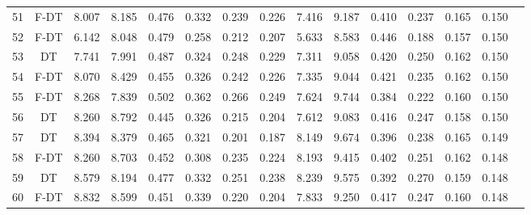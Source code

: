 \begin{longtable}{@{\hskip3pt}c@{\hskip3pt}c@{\hskip3pt}c@{\hskip3pt}c@{\hskip3pt}c@{\hskip3pt}c@{\hskip3pt}c@{\hskip3pt}c@{\hskip3pt}c@{\hskip3pt}c@{\hskip3pt}c@{\hskip3pt}c@{\hskip3pt}c@{\hskip3pt}c@{\hskip3pt}c}
         51 &           F-DT &             8.007 &       8.185 &         0.476 &       0.332 &       0.239 &        0.226 &               7.416 &       9.187 &         0.410 &       0.237 &       0.165 &        0.150 \\
         52 &           F-DT &             6.142 &       8.048 &         0.479 &       0.258 &       0.212 &        0.207 &               5.633 &       8.583 &         0.446 &       0.188 &       0.157 &        0.150 \\
         53 &             DT &             7.741 &       7.991 &         0.487 &       0.324 &       0.248 &        0.229 &               7.311 &       9.058 &         0.420 &       0.250 &       0.162 &        0.150 \\
         54 &           F-DT &             8.070 &       8.429 &         0.455 &       0.326 &       0.242 &        0.226 &               7.335 &       9.044 &         0.421 &       0.235 &       0.162 &        0.150 \\
         55 &           F-DT &             8.268 &       7.839 &         0.502 &       0.362 &       0.266 &        0.249 &               7.624 &       9.744 &         0.384 &       0.222 &       0.160 &        0.150 \\
         56 &             DT &             8.260 &       8.792 &         0.445 &       0.326 &       0.215 &        0.204 &               7.612 &       9.083 &         0.416 &       0.247 &       0.158 &        0.150 \\
         57 &             DT &             8.394 &       8.379 &         0.465 &       0.321 &       0.201 &        0.187 &               8.149 &       9.674 &         0.396 &       0.238 &       0.165 &        0.149 \\
         58 &           F-DT &             8.260 &       8.703 &         0.452 &       0.308 &       0.235 &        0.224 &               8.193 &       9.415 &         0.402 &       0.251 &       0.162 &        0.148 \\
         59 &             DT &             8.579 &       8.194 &         0.477 &       0.332 &       0.251 &        0.238 &               8.239 &       9.575 &         0.392 &       0.270 &       0.159 &        0.148 \\
         60 &           F-DT &             8.832 &       8.599 &         0.451 &       0.339 &       0.220 &        0.204 &               7.833 &       9.250 &         0.417 &       0.247 &       0.160 &        0.148 \\

\end{longtable}
